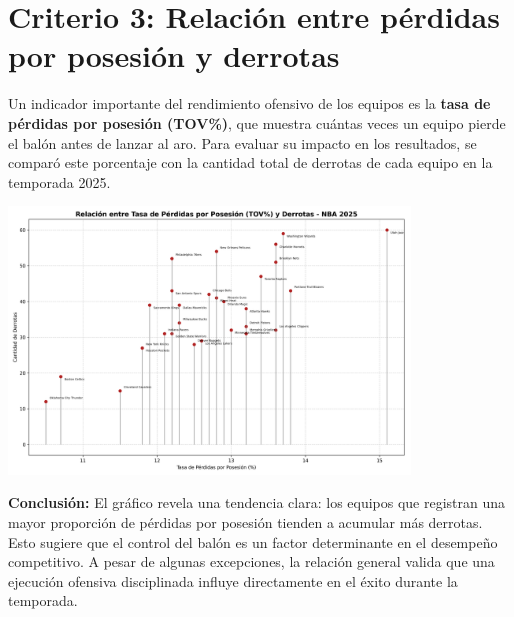 \documentclass[12pt]{article}
\begin{document}
\section*{Criterio 3: Relación entre pérdidas por posesión y derrotas}

Un indicador importante del rendimiento ofensivo de los equipos es la \textbf{tasa de pérdidas por posesión (TOV\%)}, que muestra cuántas veces un equipo pierde el balón antes de lanzar al aro. Para evaluar su impacto en los resultados, se comparó este porcentaje con la cantidad total de derrotas de cada equipo en la temporada 2025.

\begin{center}
    \includegraphics[width=0.8\textwidth]{lollipop_plot_tov_vs_derrotas.png}
\end{center}

\textbf{Conclusión:} El gráfico revela una tendencia clara: los equipos que registran una mayor proporción de pérdidas por posesión tienden a acumular más derrotas. Esto sugiere que el control del balón es un factor determinante en el desempeño competitivo. A pesar de algunas excepciones, la relación general valida que una ejecución ofensiva disciplinada influye directamente en el éxito durante la temporada.
\end{document}
